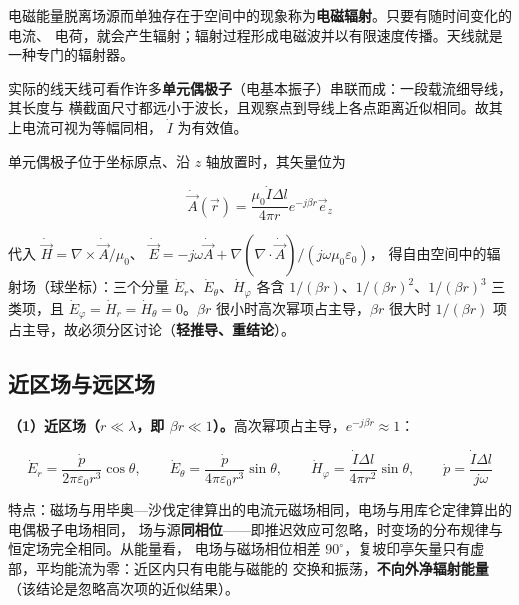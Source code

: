 电磁能量脱离场源而单独存在于空间中的现象称为\textbf{电磁辐射}。只要有随时间变化的电流、
电荷，就会产生辐射；辐射过程形成电磁波并以有限速度传播。天线就是一种专门的辐射器。

实际的线天线可看作许多\textbf{单元偶极子}（电基本振子）串联而成：一段载流细导线，其长度与
横截面尺寸都远小于波长，且观察点到导线上各点距离近似相同。故其上电流可视为等幅同相，
$\dot{I}$ 为有效值。

单元偶极子位于坐标原点、沿 $z$ 轴放置时，其矢量位为
\begin{formulaBox}
\[
\dot{\vec{A}}(\vec{r})=\frac{\mu_0\dot{I}\Delta l}{4\pi r}e^{-j\beta r}\vec{e}_z
\]
\end{formulaBox}
代入 $\dot{\vec{H}}=\nabla\times\dot{\vec{A}}/\mu_0$、
$\dot{\vec{E}}=-j\omega\dot{\vec{A}}+\nabla(\nabla\cdot\dot{\vec{A}})/(j\omega\mu_0\varepsilon_0)$，
得自由空间中的辐射场（球坐标）：三个分量 $\dot{E}_r$、$\dot{E}_\theta$、$\dot{H}_\varphi$
各含 $1/(\beta r)$、$1/(\beta r)^{2}$、$1/(\beta r)^{3}$ 三类项，且
$\dot{E}_\varphi=\dot{H}_r=\dot{H}_\theta=0$。$\beta r$ 很小时高次幂项占主导，$\beta r$ 很大时
$1/(\beta r)$ 项占主导，故必须分区讨论（\textbf{轻推导、重结论}）。

\subsection{近区场与远区场}

\textbf{（1）近区场（$r\ll\lambda$，即 $\beta r\ll1$）。}高次幂项占主导，$e^{-j\beta r}\approx1$：
\begin{formulaBox}
\[
\dot{E}_r=\frac{\dot{p}}{2\pi\varepsilon_0 r^{3}}\cos\theta,
\qquad
\dot{E}_\theta=\frac{\dot{p}}{4\pi\varepsilon_0 r^{3}}\sin\theta,
\qquad
\dot{H}_\varphi=\frac{\dot{I}\Delta l}{4\pi r^{2}}\sin\theta,
\qquad
\dot{p}=\frac{\dot{I}\Delta l}{j\omega}
\]
\end{formulaBox}
特点：磁场与用毕奥—沙伐定律算出的电流元磁场相同，电场与用库仑定律算出的电偶极子电场相同，
场与源\textbf{同相位}——即推迟效应可忽略，时变场的分布规律与恒定场完全相同。从能量看，
电场与磁场相位相差 $90^{\circ}$，复坡印亭矢量只有虚部，平均能流为零：近区内只有电能与磁能的
交换和振荡，\textbf{不向外净辐射能量}（该结论是忽略高次项的近似结果）。

